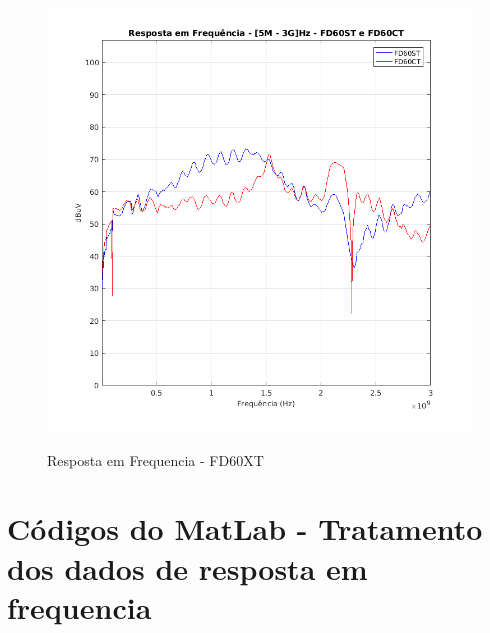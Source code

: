 \begin{figure}[H]
	\centering 
	\caption{Resposta em Frequencia - FD60XT}
	\includegraphics[scale=0.7]{./img/FD60XT}
	\label{fig:FD60XT}
\end{figure}

\section{Códigos do MatLab - Tratamento dos dados de resposta em frequencia}

